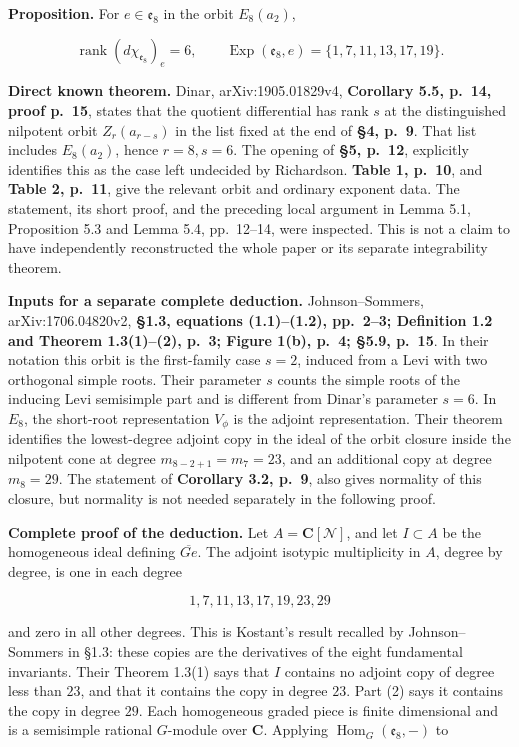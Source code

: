 \documentclass[11pt,a4paper]{article}
\theoremstyle{definition}\newtheorem{definition}[theorem]{Definition}
\theoremstyle{remark}\newtheorem{remark}[theorem]{Remark}
\begin{document}
\textbf{Proposition.} For \(e\in\mathfrak e_8\) in the orbit \(E_8(a_2)\),

\[
 \operatorname{rank}(d\chi_{\mathfrak e_8})_e=6,
 \qquad
 \operatorname{Exp}(\mathfrak e_8,e)=\{1,7,11,13,17,19\}.
 \tag{CC-RK.2}
\]

\textbf{Direct known theorem.} Dinar, arXiv:1905.01829v4, \textbf{Corollary 5.5, p.~14, proof p.~15}, states that the quotient differential has rank \(s\) at the distinguished nilpotent orbit \(Z_r(a_{r-s})\) in the list fixed at the end of \textbf{§4, p.~9}. That list includes \(E_8(a_2)\), hence \(r=8,s=6\). The opening of \textbf{§5, p.~12}, explicitly identifies this as the case left undecided by Richardson. \textbf{Table 1, p.~10}, and \textbf{Table 2, p.~11}, give the relevant orbit and ordinary exponent data. The statement, its short proof, and the preceding local argument in Lemma 5.1, Proposition 5.3 and Lemma 5.4, pp.~12--14, were inspected. This is not a claim to have independently reconstructed the whole paper or its separate integrability theorem.

\textbf{Inputs for a separate complete deduction.} Johnson--Sommers, arXiv:1706.04820v2, \textbf{§1.3, equations (1.1)--(1.2), pp.~2--3; Definition 1.2 and Theorem 1.3(1)--(2), p.~3; Figure 1(b), p.~4; §5.9, p.~15}. In their notation this orbit is the first-family case \(s=2\), induced from a Levi with two orthogonal simple roots. Their parameter \(s\) counts the simple roots of the inducing Levi semisimple part and is different from Dinar's parameter \(s=6\). In \(E_8\), the short-root representation \(V_\phi\) is the adjoint representation. Their theorem identifies the lowest-degree adjoint copy in the ideal of the orbit closure inside the nilpotent cone at degree \(m_{8-2+1}=m_7=23\), and an additional copy at degree \(m_8=29\). The statement of \textbf{Corollary 3.2, p.~9}, also gives normality of this closure, but normality is not needed separately in the following proof.

\textbf{Complete proof of the deduction.} Let \(A=\mathbf C[\mathcal N]\), and let \(I\subset A\) be the homogeneous ideal defining \(\overline{G e}\). The adjoint isotypic multiplicity in \(A\), degree by degree, is one in each degree

\[
 1,7,11,13,17,19,23,29
\]

and zero in all other degrees. This is Kostant's result recalled by Johnson--Sommers in §1.3: these copies are the derivatives of the eight fundamental invariants. Their Theorem 1.3(1) says that \(I\) contains no adjoint copy of degree less than \(23\), and that it contains the copy in degree \(23\). Part (2) says it contains the copy in degree \(29\). Each homogeneous graded piece is finite dimensional and is a semisimple rational \(G\)-module over \(\mathbf C\). Applying \(\operatorname{Hom}_G(\mathfrak e_8,-)\) to
\end{document}
